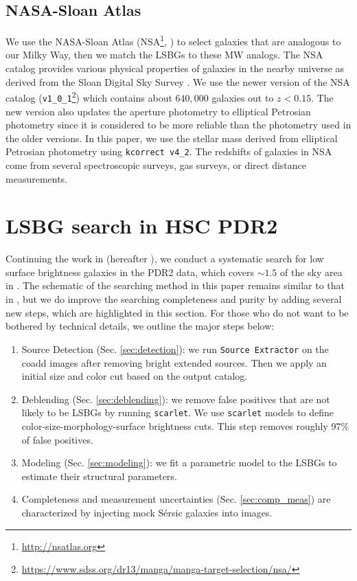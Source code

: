 \documentclass[twocolumn,astrosymb,twocolappendix]{aastex631}
\newcommand{\code}[1]{\texttt{#1}}
\newcommand{\sersic}{S\'ersic}
\begin{document}
\begin{CJK*}{UTF8}{gbsn}
\subsection{NASA-Sloan Atlas}
We use the NASA-Sloan Atlas (NSA\footnote{\url{http://nsatlas.org}}, \citealt{Blanton2005,Blanton2011}) to select galaxies that are analogous to our Milky Way, then we match the LSBGs to these MW analogs. The NSA catalog provides various physical properties of galaxies in the nearby universe as derived from the Sloan Digital Sky Survey \citep[SDSS,][]{York2000}. We use the newer version of the NSA catalog (\code{v1\_0\_1}\footnote{\url{https://www.sdss.org/dr13/manga/manga-target-selection/nsa/}}) which contains about $640,000$ galaxies out to $z < 0.15$. The new version also updates the aperture photometry to elliptical Petrosian photometry since it is considered to be more reliable than the photometry used in the older versions. In this paper, we use the stellar mass derived from elliptical Petrosian photometry using \code{kcorrect v4\_2}. The redshifts of galaxies in NSA come from several spectroscopic surveys, gas surveys, or direct distance measurements. 

\section{LSBG search in HSC PDR2}
Continuing the work in \citet{Greco2018} (hereafter ), we conduct a systematic search for low surface brightness galaxies in the PDR2 data, which covers $\sim 1.5$ of the sky area in . The schematic of the searching method in this paper remains similar to that in , but we do improve the searching completeness and purity by adding several new steps, which are highlighted in this section. For those who do not want to be bothered by technical details, we outline the major steps below:
\begin{enumerate}
    \item Source Detection (Sec. \ref{sec:detection}): we run \code{Source Extractor} on the coadd images after removing bright extended sources. Then we apply an initial size and color cut based on the output catalog. 
    \item Deblending (Sec. \ref{sec:deblending}): we remove false positives that are not likely to be LSBGs by running \code{scarlet}. We use \code{scarlet} models to define color-size-morphology-surface brightness cuts. This step removes roughly 97\% of false positives.
    \item Modeling (Sec. \ref{sec:modeling}): we fit a parametric model to the LSBGs to estimate their structural parameters. 
    \item Completeness and measurement uncertainties (Sec. \ref{sec:comp_meas}) are characterized by injecting mock \sersic{} galaxies into images. 
\end{enumerate}


\end{CJK*}
\end{document}
